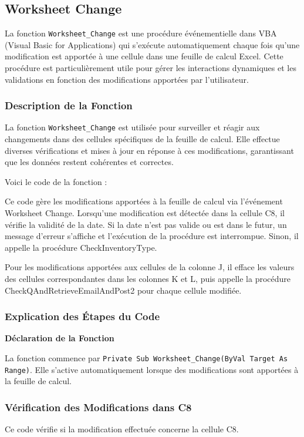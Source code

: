 \documentclass[a4paper, oneside, 12pt, final]{extreport}
\begin{document}
\subsection{Worksheet Change}

La fonction \texttt{Worksheet\_Change} est une procédure événementielle dans VBA (Visual Basic for Applications) qui s'exécute automatiquement chaque fois qu'une modification est apportée à une cellule dans une feuille de calcul Excel. Cette procédure est particulièrement utile pour gérer les interactions dynamiques et les validations en fonction des modifications apportées par l'utilisateur.

\subsubsection{Description de la Fonction}

La fonction \texttt{Worksheet\_Change} est utilisée pour surveiller et réagir aux changements dans des cellules spécifiques de la feuille de calcul. Elle effectue diverses vérifications et mises à jour en réponse à ces modifications, garantissant que les données restent cohérentes et correctes.

Voici le code de la fonction :

Ce code gère les modifications apportées à la feuille de calcul via l'événement Worksheet Change. Lorsqu'une modification est détectée dans la cellule C8, il vérifie la validité de la date. Si la date n'est pas valide ou est dans le futur, un message d'erreur s'affiche et l'exécution de la procédure est interrompue. Sinon, il appelle la procédure CheckInventoryType.

Pour les modifications apportées aux cellules de la colonne J, il efface les valeurs des cellules correspondantes dans les colonnes K et L, puis appelle la procédure CheckQAndRetrieveEmailAndPost2 pour chaque cellule modifiée.

\subsubsection{Explication des Étapes du Code}

\textbf{Déclaration de la Fonction}

La fonction commence par \texttt{Private Sub Worksheet\_Change(ByVal Target As Range)}. Elle s'active automatiquement lorsque des modifications sont apportées à la feuille de calcul.

\subsubsection{Vérification des Modifications dans C8}
Ce code vérifie si la modification effectuée concerne la cellule C8.
\end{document}
